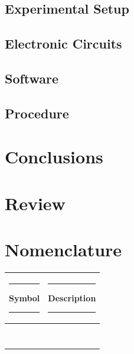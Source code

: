 \documentclass{report}
\begin{document}
	\section{Experimental Setup}
	\section{Electronic Circuits}
	\section{Software}
	\section{Procedure}
	\chapter*{Conclusions}
	
	\chapter*{Review}
	
	\chapter*{Nomenclature}
	\begin{center}
		\begin{tabular}{|c|c|}
			\hline
			\rule{3cm}{0pt}\textbf{Symbol}\rule{3cm}{0pt} & \rule{3cm}{0pt}\textbf{Description}\rule{3cm}{0pt} \\
			\hline
			 & \\
			\hline
			& \\
			\hline
			& \\
			\hline
			& \\
			\hline
			& \\
			\hline
			& \\
			\hline
			& \\
			\hline
			& \\
			\hline
		\end{tabular}
	\end{center}
	
\end{document}
